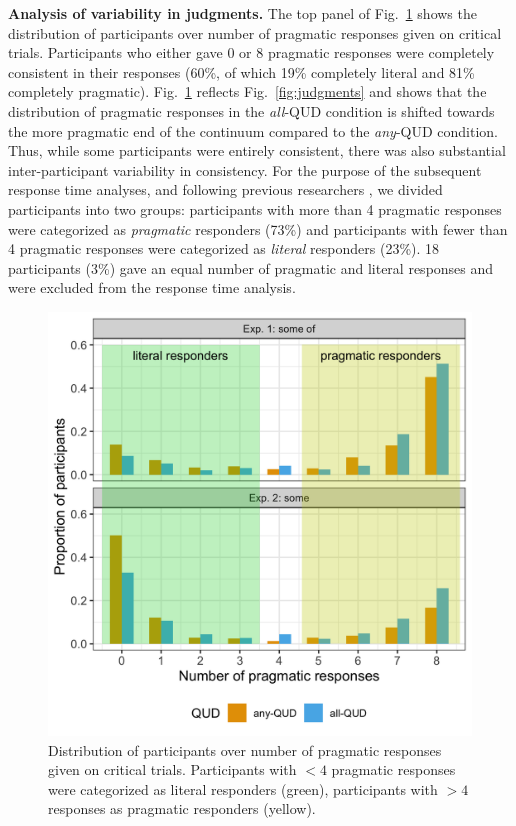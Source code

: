 \documentclass[10pt,letterpaper]{article}
\newcommand{\figref}[1]{Fig.~\ref{#1}}
\begin{document}
\noindent \textbf{Analysis of variability in judgments.} The top panel of \figref{fig:proportion} shows the distribution of participants over number of pragmatic responses given on critical trials. Participants who either gave 0 or 8 pragmatic responses were completely consistent in their responses (60\%, of which 19\% completely literal and 81\% completely pragmatic). \figref{fig:proportion} reflects \figref{fig:judgments} and shows that the distribution of pragmatic responses in the \emph{all}-QUD condition is shifted towards the more pragmatic end of the continuum compared to the \emph{any}-QUD condition. Thus, while some participants were entirely consistent, there was also substantial inter-participant variability in consistency. For the purpose of the subsequent response time analyses, and following previous researchers \cite{BottNoveck2004,DegenTanenhaus2015}, we divided participants into two groups:  participants with more than 4 pragmatic responses were categorized as \emph{pragmatic} responders (73\%) and participants with fewer than 4 pragmatic responses were categorized as \emph{literal} responders (23\%). 18 participants (3\%) gave an equal number of pragmatic and literal responses and were excluded from the response time analysis.


\begin{figure}
  \includegraphics[width=\linewidth]{plots/proportion.png}
  \caption{Distribution of participants over number of pragmatic responses given on critical trials. Participants with $< 4$ pragmatic responses were categorized as literal responders (green), participants with $> 4$ responses as pragmatic responders (yellow). }
  \label{fig:proportion}
\end{figure}
\end{document}
